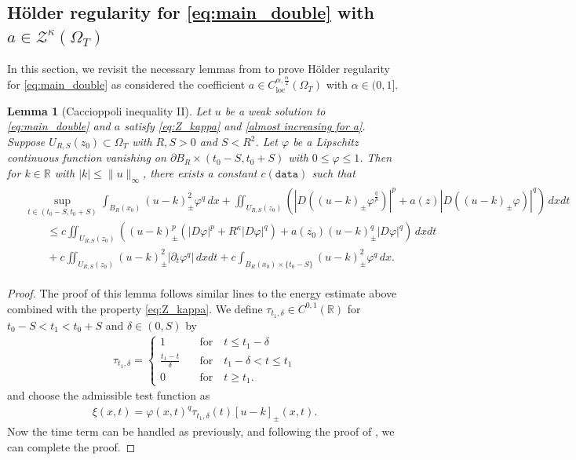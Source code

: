 \documentclass[notitlepage,11pt,reqno]{amsart}
\newtheorem{lemma}[theorem]{Lemma}
\theoremstyle{definition}
\numberwithin{equation}{section}
\newcommand{\RR}{\mathds{R}}
\begin{document}
\subsection{H\"older regularity for \eqref{eq:main_double} with $a\in \mathcal{Z}^{\kappa}(\Omega_T)$} In this section, we revisit the necessary lemmas from \cite{Kim2025holder} to prove H\"older regularity for \eqref{eq:main_double} as \cite{Kim2025holder} considered the coefficient $a \in C^{\alpha, \frac{\alpha}{2}}_{\mathrm{loc}}(\Omega_T)$ with $\alpha \in (0, 1].$
\begin{lemma}[Caccioppoli inequality II]\label{Caccio 1}
Let $u$ be a weak solution to \eqref{eq:main_double} and $a$ satisfy \eqref{eq:Z_kappa} and \eqref{almost increasing for a}. Suppose $U_{R, S}(z_0)\subset\Omega_T$ with $R,S>0$ and $S<R^2$. Let $\varphi$ be a Lipschitz continuous function vanishing on $\partial B_R \times (t_0-S,t_0+S)$ with $0\le \varphi\le 1$. 
Then for $k \in \RR$ with $|k| \leq \|u\|_\infty$, there exists a constant $c(\texttt{data})$ such that
	\begin{align*}
		\begin{split}
			& \sup_{t\in (t_0-S,t_0+S)}\int_{B_{R}(x_0)}  (u-k)_{\pm}^2\varphi^q\, dx 
            + \iint_{U_{R,S}(z_0)} (|D ((u-k)_\pm\varphi^\frac{q}{p})|^p+a(z)|D ((u-k)_\pm\varphi)|^q)\, dx dt  \\
			&\qquad\le c\iint_{U_{R,S}(z_0)} ((u-k)_\pm^p (|D \varphi|^p+R^\kappa |D \varphi|^{q} ) +a(z_0)(u-k)_\pm^q |D \varphi|^q )\, dx dt\\
			&\qquad+c\iint_{U_{R,S}(z_0)} (u-k)_\pm^2 |\partial_t \varphi^q| \, dx dt + c\int_{B_R(x_0) \times \{t_0-S\}}  (u-k)_\pm^2\varphi^q \, dx.
		\end{split}
	\end{align*}
\end{lemma}
\begin{proof}
The proof of this lemma follows similar lines to the energy estimate above combined with the property \eqref{eq:Z_kappa}. We define $\tau_{t_1, \delta} \in C^{0, 1}(\RR)$ for $t_0-S<t_1<t_0+S$ and $\delta \in (0, S)$ by 
\begin{align*}
    \tau_{t_1, \delta}=\begin{cases}
        1\quad &\text{for} \quad t \leq t_1-\delta\\
        \frac{t_1-t}{\delta}\quad &\text{for} \quad t_1-\delta<t\leq t_1\\
        0\quad &\text{for} \quad t \geq t_1.
    \end{cases}
\end{align*}
and choose the admissible test function as 
\begin{align*}
    \xi(x, t)=\varphi(x, t)^q\tau_{t_1, \delta}(t)[u-k]_{\pm}(x, t).
\end{align*}
Now the time term can be handled as previously, and following the proof of \cite[Lemma 3.1]{Kim2025holder}, we can complete the proof.
\end{proof}
\end{document}
